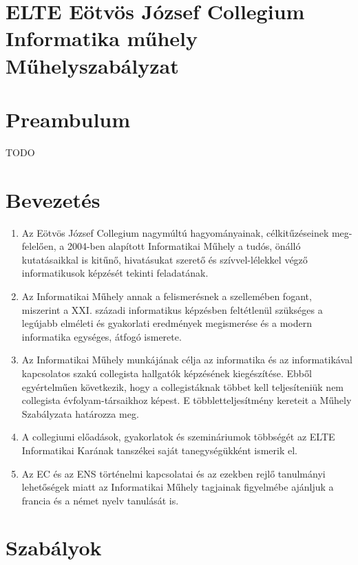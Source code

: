 \documentclass{../styles/rulebook}
\begin{document}
\section*{ELTE Eötvös József Collegium \\ Informatika műhely\\ \vspace{0.5em} Műhelyszabályzat} 

\vspace{2em}

\section*{Preambulum}
TODO


\section{Bevezetés}

\begin{enumerate}
	\item Az Eötvös József Collegium nagymúltú hagyományainak, célkitűzéseinek meg-felelően, a 2004-ben alapított Informatikai Műhely a tudós, önálló kutatásaikkal is kitűnő, hivatásukat szerető és szívvel-lélekkel végző informatikusok képzését tekinti feladatának.
	\item Az Informatikai Műhely annak a felismerésnek a szellemében fogant, miszerint a XXI. századi informatikus képzésben feltétlenül szükséges a legújabb elméleti és gyakorlati eredmények megismerése és a modern informatika egységes, átfogó ismerete.
	\item Az Informatikai Műhely munkájának célja az informatika és az informatikával kapcsolatos szakú collegista hallgatók képzésének kiegészítése. Ebből egyértelműen következik, hogy a collegistáknak többet kell teljesíteniük nem collegista évfolyam-társaikhoz képest. E többletteljesítmény kereteit a Műhely Szabályzata határozza meg.
	\item A collegiumi előadások, gyakorlatok és szemináriumok többségét az ELTE Informatikai Karának tanszékei saját tanegységükként ismerik el.
	\item Az EC és az ENS történelmi kapcsolatai és az ezekben rejlő tanulmányi lehetőségek miatt az Informatikai Műhely tagjainak figyelmébe ajánljuk a francia és a német nyelv tanulását is.
\end{enumerate}


\section{Szabályok}
\end{document}
